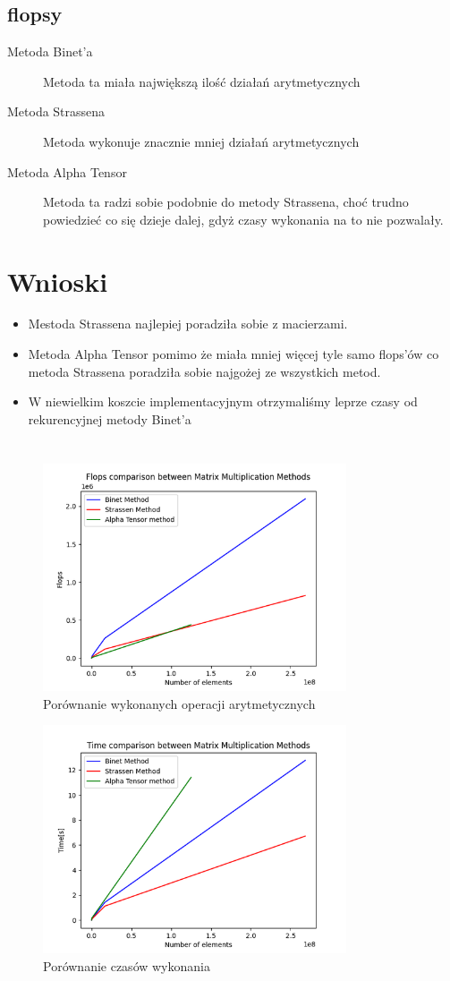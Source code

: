 \documentclass{article}
\begin{document}
\subsection*{flopsy}

\begin{description}
\item[Metoda Binet'a] Metoda ta miała największą ilość działań arytmetycznych
\item[Metoda Strassena] Metoda wykonuje znacznie mniej działań arytmetycznych
\item[Metoda Alpha Tensor] Metoda ta radzi sobie podobnie do metody Strassena, choć trudno powiedzieć co się dzieje dalej, gdyż czasy wykonania na to nie pozwalały.
\end{description}

\section{Wnioski}
\begin{itemize}
  \item Mestoda Strassena najlepiej poradziła sobie z macierzami.
  \item Metoda Alpha Tensor pomimo że miała mniej więcej tyle samo flops'ów co metoda Strassena poradziła sobie najgożej ze wszystkich metod.
  \item W niewielkim koszcie implementacyjnym otrzymaliśmy leprze czasy od rekurencyjnej metody Binet'a
\end{itemize}
\section*{}
\begin{figure}
\centering
\includegraphics[width=0.8\textwidth]{output.png}
\caption{Porównanie wykonanych operacji arytmetycznych}
\end{figure}
\begin{figure}
\centering
\includegraphics[width=0.8\textwidth]{output2.png}
\caption{Porównanie czasów wykonania}
\end{figure}
\end{document}
